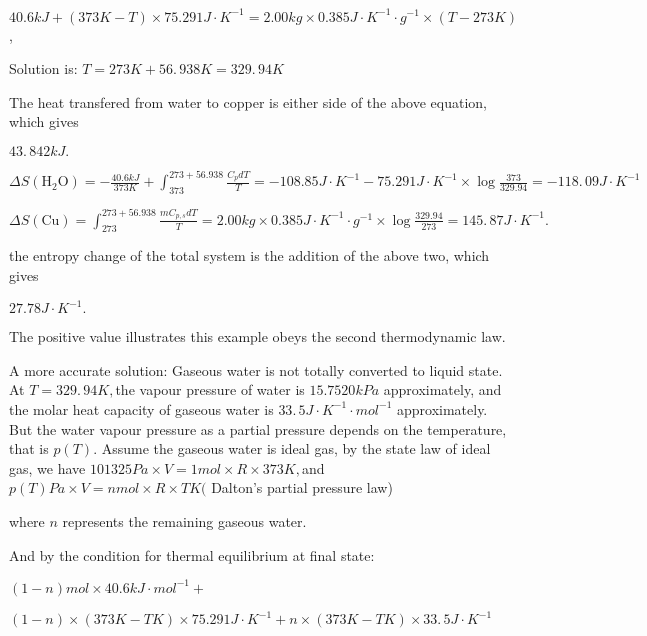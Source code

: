 \documentclass{article}
\begin{document}
$40.6\unit{kJ}+\left( 373\unit{K}-T\right) \times 75.291\unit{J}\cdot \unit{K%
}^{-1}=2.00\unit{kg}\times 0.385\unit{J}\cdot \unit{K}^{-1}\cdot \unit{g}%
^{-1}\times \left( T-273\unit{K}\right) $,

Solution is: $T=273\unit{K}+56.\,\allowbreak 938\unit{K}=\allowbreak
329.\,\allowbreak 94\unit{K}$

The heat transfered from water to copper is either side of the above
equation, which gives

$\allowbreak 43.\,\allowbreak 842\unit{kJ}.$

$\Delta S\left( \text{H}_{2}\text{O}\right) =-\frac{40.6\unit{kJ}}{373\unit{K%
}}+\int_{373}^{273+56.938}\frac{C_{p}dT}{T}=-108.85\unit{J}\cdot \unit{K}%
^{-1}-75.291\unit{J}\cdot \unit{K}^{-1}\times \log \frac{373}{329.94}%
=\allowbreak -118.\,\allowbreak 09\unit{J}\cdot \unit{K}^{-1}$

$\Delta S\left( \text{Cu}\right) =\int_{273}^{273+56.938}\frac{mC_{p,s}dT}{T}%
=2.00\unit{kg}\times 0.385\unit{J}\cdot \unit{K}^{-1}\cdot \unit{g}%
^{-1}\times \log \frac{329.94}{273}=145.\,87\unit{J}\cdot \unit{K}^{-1}.$

the entropy change of the total system is the addition of the above two,
which gives

$27.78\unit{J}\cdot \unit{K}^{-1}.$

The positive value illustrates this example obeys the second thermodynamic
law.

\bigskip A more accurate solution: Gaseous water is not totally converted to
liquid state. At $T=\allowbreak 329.\,\allowbreak 94K,$the vapour pressure
of water is $15.7520\unit{kPa}$ approximately, and the molar heat capacity
of gaseous water is $\allowbreak 33.\,\allowbreak 5\unit{J}\cdot \unit{K}%
^{-1}\cdot \unit{mol}^{-1}$ approximately. But the water vapour pressure as
a partial pressure depends on the temperature, that is $p\left( T\right) .$%
Assume the gaseous water is ideal gas, by the state law of ideal gas, we
have $101325\unit{Pa}\times V=1\unit{mol}\times R\times 373\unit{K},$and $%
p\left( T\right) \unit{Pa}\times V=n\unit{mol}\times R\times T\unit{K}($%
Dalton's partial pressure law)

where $n$ represents the remaining gaseous water.

And by the condition for thermal equilibrium at final state:

$\left( 1-n\right) \unit{mol}\times 40.6\unit{kJ}\cdot \unit{mol}^{-1}+$

$\left( 1-n\right) \times \left( 373\unit{K}-T\unit{K}\right) \times 75.291%
\unit{J}\cdot \unit{K}^{-1}+n\times \left( 373\unit{K}-T\unit{K}\right)
\times \allowbreak 33.\,\allowbreak 5\unit{J}\cdot \unit{K}^{-1}$
\end{document}
